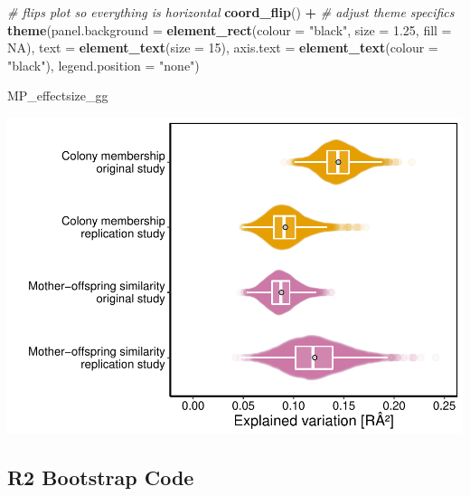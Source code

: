 \documentclass[]{article}
\newenvironment{Shaded}{\begin{snugshade}}{\end{snugshade}}
\newcommand{\KeywordTok}[1]{\textcolor[rgb]{0.13,0.29,0.53}{\textbf{#1}}}
\newcommand{\DataTypeTok}[1]{\textcolor[rgb]{0.13,0.29,0.53}{#1}}
\newcommand{\DecValTok}[1]{\textcolor[rgb]{0.00,0.00,0.81}{#1}}
\newcommand{\FloatTok}[1]{\textcolor[rgb]{0.00,0.00,0.81}{#1}}
\newcommand{\StringTok}[1]{\textcolor[rgb]{0.31,0.60,0.02}{#1}}
\newcommand{\CommentTok}[1]{\textcolor[rgb]{0.56,0.35,0.01}{\textit{#1}}}
\newcommand{\OtherTok}[1]{\textcolor[rgb]{0.56,0.35,0.01}{#1}}
\newcommand{\OperatorTok}[1]{\textcolor[rgb]{0.81,0.36,0.00}{\textbf{#1}}}
\newcommand{\NormalTok}[1]{#1}
\begin{document}
\begin{Shaded}
\begin{Highlighting}[]
\StringTok{  }\CommentTok{# flips plot so everything is horizontal}
\StringTok{  }\KeywordTok{coord_flip}\NormalTok{() }\OperatorTok{+}
\StringTok{  }\CommentTok{# adjust theme specifics}
\StringTok{  }\KeywordTok{theme}\NormalTok{(}\DataTypeTok{panel.background =} \KeywordTok{element_rect}\NormalTok{(}\DataTypeTok{colour =} \StringTok{"black"}\NormalTok{, }\DataTypeTok{size =} \FloatTok{1.25}\NormalTok{, }\DataTypeTok{fill =} \OtherTok{NA}\NormalTok{),}
        \DataTypeTok{text =} \KeywordTok{element_text}\NormalTok{(}\DataTypeTok{size =} \DecValTok{15}\NormalTok{),}
        \DataTypeTok{axis.text =} \KeywordTok{element_text}\NormalTok{(}\DataTypeTok{colour =} \StringTok{"black"}\NormalTok{),}
        \DataTypeTok{legend.position =} \StringTok{"none"}\NormalTok{)}


\NormalTok{MP_effectsize_gg}
\end{Highlighting}
\end{Shaded}

\includegraphics{SealScent_SI_Markdown_2020_1_files/figure-latex/Effect size estimate plot-1.pdf}

\subsection{R2 Bootstrap Code}\label{r2-bootstrap-code}
\end{document}
